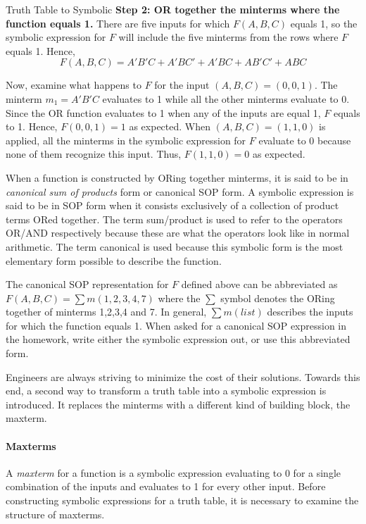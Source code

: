 \begin{process}{Truth Table to Symbolic}
\textbf{Step 2: OR together the minterms where the function equals 1.}
There are five inputs for which $F(A,B,C)$ equals 1, so the symbolic
expression for $F$ will include the five minterms from the rows where
$F$ equals 1.  Hence, 
$$F(A,B,C) =  A'B'C + A'BC' + A'BC + AB'C' + ABC$$

Now, examine what happens to $F$ for the input $(A,B,C)=(0,0,1)$.  
The minterm $m_1=A'B'C$ evaluates to 1 while all the other minterms 
evaluate to 0.  Since the OR function evaluates to 1 when any of 
the inputs are equal 1, $F$ equals to 1. Hence, $F(0,0,1)=1$ as
expected.  When $(A,B,C)=(1,1,0)$ is applied, all the
minterms in the symbolic expression for $F$ evaluate to 0 because
none of them recognize this input.  Thus, $F(1,1,0)=0$ as expected.
\end{process}

When a function is constructed by ORing together minterms, it is
said to be in \textit{canonical sum of products} 
 form or canonical SOP form.  A symbolic
expression is said to be in SOP form when it consists
exclusively of a collection of product terms ORed together.  
The term sum/product is used to refer to the operators OR/AND 
respectively because these are what the operators look like in 
normal arithmetic. The term canonical is used because this 
symbolic form is the most elementary form possible to describe 
the function.

The canonical SOP representation for $F$ defined above can be 
abbreviated as $F(A,B,C) = \sum m(1,2,3,4,7)$  where the $\sum$
symbol denotes the ORing together of minterms 1,2,3,4 and 7.
In general, $\sum m(list)$ describes the inputs for which the
function equals 1.  When asked for a canonical SOP expression
in the homework, write either the symbolic expression
out, or use this abbreviated form.

Engineers are always striving to minimize the cost of their solutions.
Towards this end, a second way to transform a truth table into a 
symbolic expression is introduced.  It replaces the minterms with 
a different kind of building block, the maxterm.

\paragraph{Maxterms}
A \textit{maxterm} for a function is a symbolic expression evaluating
to 0 for a single combination of the inputs and evaluates to 1 for 
every other input.  Before constructing symbolic expressions for
a truth table, it is necessary to examine the structure of maxterms.

